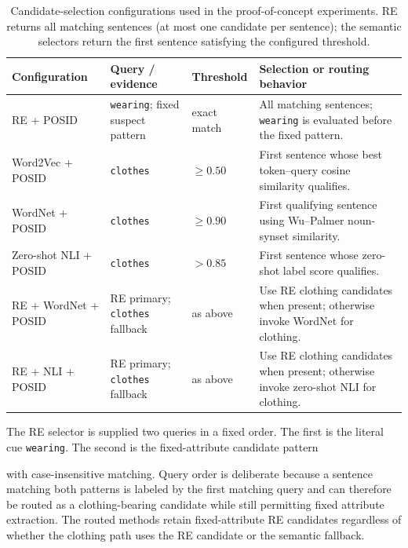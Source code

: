\documentclass[sigconf,nonacm]{acmart}
\newcommand{\posid}{\textsc{POSID}}
\begin{document}
\begin{table}[t]
    \centering
    \caption{Candidate-selection configurations used in the proof-of-concept
    experiments.  RE returns all matching sentences (at most one candidate per
    sentence); the semantic selectors return the first sentence satisfying the
    configured threshold.}
    \label{tab:selector-config}
    \small
    \begin{tabular}{p{}p{}p{}p{}}
        \toprule
        Configuration & Query / evidence & Threshold & Selection or routing behavior \\
        \midrule
        RE + \posid{} & \texttt{wearing}; fixed suspect pattern & exact match & All matching sentences; \texttt{wearing} is evaluated before the fixed pattern. \\
        Word2Vec + \posid{} & \texttt{clothes} & $\geq 0.50$ & First sentence whose best token--query cosine similarity qualifies. \\
        WordNet + \posid{} & \texttt{clothes} & $\geq 0.90$ & First qualifying sentence using Wu--Palmer noun-synset similarity. \\
        Zero-shot NLI + \posid{} & \texttt{clothes} & $>0.85$ & First sentence whose zero-shot label score qualifies. \\
        RE + WordNet + \posid{} & RE primary; \texttt{clothes} fallback & as above & Use RE clothing candidates when present; otherwise invoke WordNet for clothing. \\
        RE + NLI + \posid{} & RE primary; \texttt{clothes} fallback & as above & Use RE clothing candidates when present; otherwise invoke zero-shot NLI for clothing. \\
        \bottomrule
    \end{tabular}
\end{table}

The RE selector is supplied two queries in a fixed order.  The first is the
literal cue \texttt{wearing}.  The second is the fixed-attribute candidate
pattern
\begin{center}
\texttt{}
\end{center}
with case-insensitive matching.  Query order is deliberate because a sentence
matching both patterns is labeled by the first matching query and can therefore
be routed as a clothing-bearing candidate while still permitting fixed
attribute extraction.  The routed methods retain fixed-attribute RE candidates
regardless of whether the clothing path uses the RE candidate or the semantic
fallback.
\end{document}
